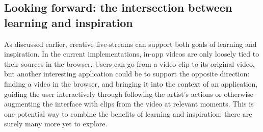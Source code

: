 \subsection{Looking forward: the intersection between learning and inspiration}
As discussed earlier, creative live-streams can support both goals of learning and inspiration. In the current implementations, in-app videos are only loosely tied to their sources in the browser. Users can go from a video clip to its original video, but another interesting application could be to support the opposite direction: finding a video in the browser, and bringing it into the context of an application, guiding the user interactively through following the artist's actions or otherwise augmenting the interface with clips from the video at relevant moments. This is one potential way to combine the benefits of learning and inspiration; there are surely many more yet to explore.
